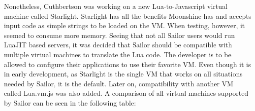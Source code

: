 \documentclass{article}
\begin{document}
Nonetheless, Cuthbertson was working on a new Lua-to-Javascript virtual machine called Starlight\autocite{starlight}. Starlight has all the benefits Moonshine has and accepts input code as simple strings to be loaded on the VM. When testing, however, it seemed to consume more memory. Seeing that not all Sailor users would run LuaJIT based servers, it was decided that Sailor should be compatible with multiple virtual machines to translate the Lua code. The developer is to be allowed to configure their applications to use their favorite VM. Even though it is in early development, as Starlight is the single VM that works on all situations needed by Sailor, it is the default. Later on, compatibility with another VM called Lua.vm.js\autocite{luavmjs} was also added. A comparison of all virtual machines supported by Sailor can be seen in the following table:
\clearpage
\end{document}
